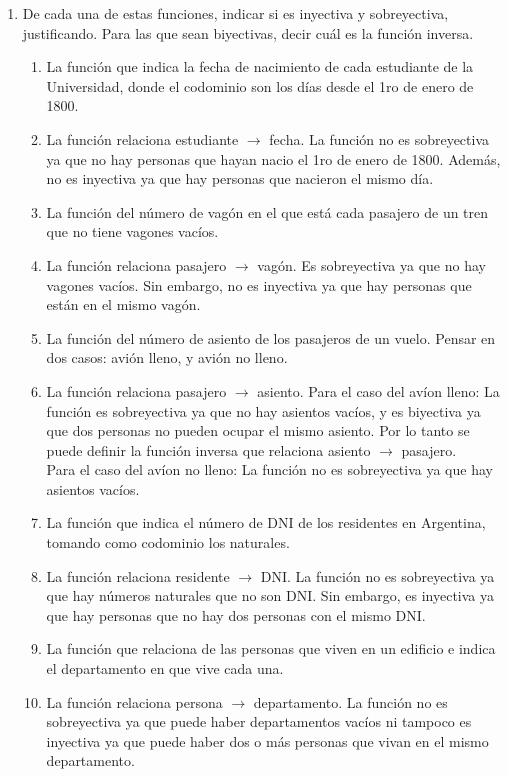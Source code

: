 \documentclass[a4paper]{article}
\newcommand{\answer}{\item[**]}
\newcommand{\exercise}{\item}
\begin{document}
\begin{enumerate}
	\exercise De cada una de estas funciones, indicar si es inyectiva y sobreyectiva, justificando. Para las que sean biyectivas, decir cuál es la función inversa.
	\begin{enumerate} [label=(\alph*)]
		\item La función que indica la fecha de nacimiento de cada estudiante de la Universidad, donde el codominio son los días desde el 1ro de enero de 1800.
		\answer La función relaciona estudiante $\to$ fecha. La función no es sobreyectiva ya que no hay personas que hayan nacio el 1ro de enero de 1800. Además, no es inyectiva ya que hay personas que nacieron el mismo día.
		
		\item La función del número de vagón en el que está cada pasajero de un tren que no tiene vagones vacíos.
		\answer La función relaciona pasajero $\to$ vagón. Es sobreyectiva ya que no hay vagones vacíos. Sin embargo, no es inyectiva ya que hay personas que están en el mismo vagón.

		\item La función del número de asiento de los pasajeros de un vuelo. Pensar en dos casos: avión lleno, y avión no lleno.
		\answer La función relaciona pasajero $\to$ asiento. Para el caso del avíon lleno: La función es sobreyectiva ya que no hay asientos vacíos, y es biyectiva ya que dos personas no pueden ocupar el mismo asiento. Por lo tanto se puede definir la función inversa que relaciona asiento $\to$ pasajero. \\ Para el caso del avíon no lleno: La función no es sobreyectiva ya que hay asientos vacíos.

		\item La función que indica el número de DNI de los residentes en Argentina, tomando como codominio los naturales.
		\answer La función relaciona residente $\to$ DNI. La función no es sobreyectiva ya que hay números naturales que no son DNI. Sin embargo, es inyectiva ya que hay personas que no hay dos personas con el mismo DNI.

		\item La función que relaciona de las personas que viven en un edificio e indica el departamento en que vive cada una.
		\answer La función relaciona persona $\to$ departamento. La función no es sobreyectiva ya que puede haber departamentos vacíos ni tampoco es inyectiva ya que puede haber dos o más personas que vivan en el mismo departamento.


\end{enumerate}
\end{enumerate}
\end{document}
